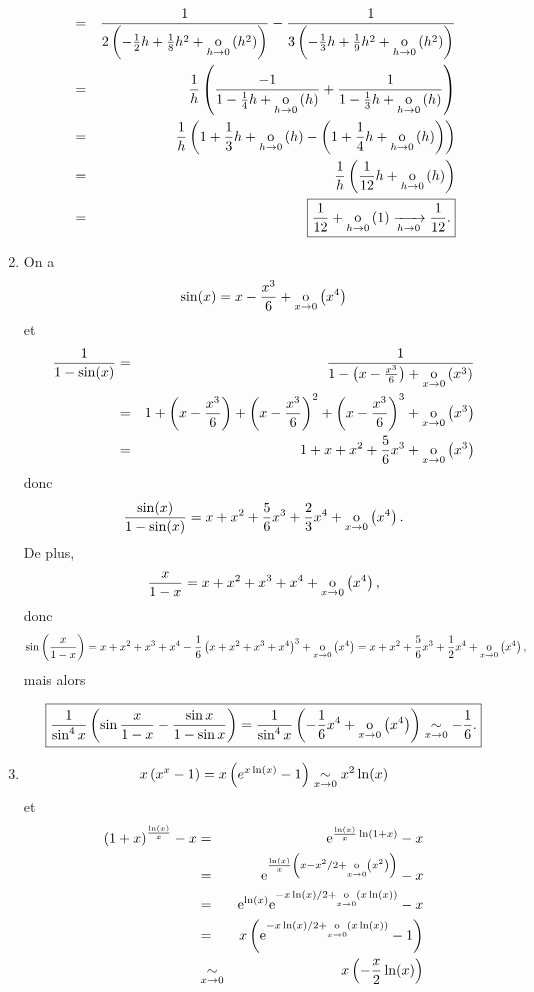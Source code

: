 \documentclass{magnolia}
\begin{document}
\begin{sol}
\begin{enumerate}
\begin{eqnarray*}
&=&\frac{1}{2\p{-\frac{1}{2}h+\frac{1}{8}h^2+\petitozero{h}{h^2}}}-\frac{1}{3\p{-\frac{1}{3}h+\frac{1}{9}h^2+\petitozero{h}{h^2}}}\\
&=&\frac{1}{h}\p{\frac{-1}{1-\frac{1}{4}h+\petitozero{h}{h}}+\frac{1}{1-\frac{1}{3}h+\petitozero{h}{h}}}\\
&=&\frac{1}{h}\p{1+\frac{1}{3}h+\petitozero{h}{h}-\p{1+\frac{1}{4}h+\petitozero{h}{h}}}\\
&=&\frac{1}{h}\p{\frac{1}{12}h+\petitozero{h}{h}}\\
&=&\boxed{\frac{1}{12}+\petitozero{h}{1}\tendvers{h}{0}{\frac{1}{12}}.}
\end{eqnarray*}
\item On a $$\sin(x)=x-\frac{x^3}{6}+\petitozero{x}{x^4}$$
et 
\begin{eqnarray*}
\frac{1}{1-\sin(x)}&=&\frac{1}{1-\p{x-\frac{x^3}{6}}+\petitozero{x}{x^3}}\\
&=&1+\p{x-\frac{x^3}{6}}+\p{x-\frac{x^3}{6}}^2+\p{x-\frac{x^3}{6}}^3+\petitozero{x}{x^3}\\
&=&1+x+x^2+\frac{5}{6}x^3+\petitozero{x}{x^3}
\end{eqnarray*}
donc 
$$\frac{\sin(x)}{1-\sin(x)}=x+x^2+\frac{5}{6}x^3+\frac{2}{3}x^4+\petitozero{x}{x^4}.$$
De plus, $$\frac{x}{1-x}=x+x^2+x^3+x^4+\petitozero{x}{x^4},$$
donc $$\sin\p{\frac{x}{1-x}}=x+x^2+x^3+x^4-\frac{1}{6}\p{x+x^2+x^3+x^4}^3+\petitozero{x}{x^4}=x+x^2+\frac{5}{6}x^3+\frac{1}{2}x^4+\petitozero{x}{x^4},$$
mais alors

$$\boxed{\frac{1}{\sin^4 x}\p{\sin\frac{x}{1-x}-\frac{\sin x}{1-\sin x}}=\frac{1}{\sin^4 x}\p{-\frac{1}{6}x^4+\petitozero{x}{x^4}}\equi{x}{0}{-\frac{1}{6}}.}$$

\item $$x\p{x^x-1}=x\p{e^{x\ln(x)}-1}\equi{x}{0}{x^2\ln(x)}$$
et 
\begin{eqnarray*}
\p{1+x}^{\frac{\ln(x)}{x}}-x&=& \e^{\frac{\ln(x)}{x}\ln(1+x)}-x\\
&=& \e^{\frac{\ln(x)}{x}\p{x-x^2/2+\petitozero{x}{x^2}}}-x\\
&=&\e^{\ln(x)}\e^{-x\ln(x)/2+\petitozero{x}{x\ln(x)}}-x\\
&=&x\p{\e^{-x\ln(x)/2+\petitozero{x}{x\ln(x)}}-1}\\
&\equi{x}{0}&x\p{-\frac{x}{2}\ln(x)}
\end{eqnarray*}
\end{enumerate}
\end{sol}
\end{document}
